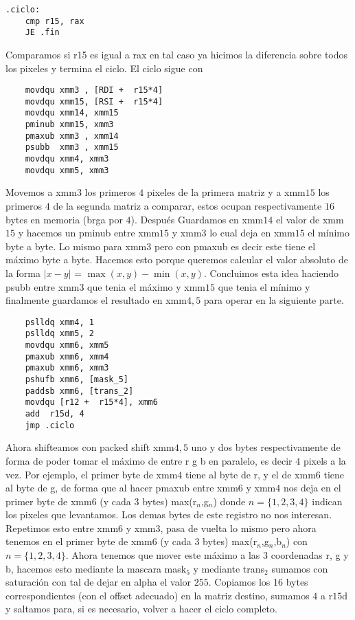 \documentclass[a4paper]{article}
\begin{document}
\begin{codesnippet}
\begin{verbatim}
.ciclo:
    cmp r15, rax
    JE .fin
\end{verbatim}
\end{codesnippet}

\noindent Comparamos si r15 es igual a rax en tal caso ya hicimos la diferencia sobre todos los pixeles y termina el ciclo. El ciclo sigue con

\begin{codesnippet}
\begin{verbatim}
    movdqu xmm3 , [RDI +  r15*4]   
    movdqu xmm15, [RSI +  r15*4]
    movdqu xmm14, xmm15     
    pminub xmm15, xmm3        
    pmaxub xmm3 , xmm14        
    psubb  xmm3 , xmm15             
    movdqu xmm4, xmm3 
    movdqu xmm5, xmm3       
\end{verbatim}
\end{codesnippet}

\noindent Movemos a xmm$3$ los primeros $4$ pixeles de la primera matriz y a xmm$15$ los primeros $4$ de la segunda matriz a comparar, estos ocupan respectivamente $16$ bytes en memoria (brga por $4$). Después Guardamos en xmm$14$ el valor de xmm$15$ y hacemos un pminub entre xmm$15$ y xmm$3$ lo cual deja en xmm$15$ el mínimo byte a byte. Lo mismo para xmm$3$ pero con pmaxub es decir este tiene el máximo byte a byte. Hacemos esto porque queremos calcular el valor absoluto de la forma $|x-y|$ = $\max(x,y) - \min(x,y)$. Concluimos esta idea haciendo psubb entre xmm$3$ que tenia el máximo y xmm$15$ que tenia el mínimo y finalmente guardamos el resultado en xmm$4,5$ para operar en la siguiente parte.

\begin{codesnippet}
\begin{verbatim}
    pslldq xmm4, 1                  
    pslldq xmm5, 2               
    movdqu xmm6, xmm5             
    pmaxub xmm6, xmm4             
    pmaxub xmm6, xmm3              
    pshufb xmm6, [mask_5] 
    paddsb xmm6, [trans_2]
    movdqu [r12 +  r15*4], xmm6
    add  r15d, 4
    jmp .ciclo
\end{verbatim}
\end{codesnippet}
\noindent Ahora shifteamos con packed shift xmm$4,5$ uno y dos bytes respectivamente de forma de poder tomar el máximo de entre r g b en paralelo, es decir $4$ pixels a la vez. Por ejemplo, el primer byte de xmm$4$ tiene al byte de r, y el de xmm$6$ tiene al byte de g, de forma que al hacer pmaxub entre  xmm$6$ y xmm$4$ nos deja en el primer byte de xmm$6$ (y cada 3 bytes) max(r$_n$,g$_n$) donde $n = \{1,2,3,4 \}$ indican los pixeles que levantamos. Los demas bytes de este registro no nos interesan. Repetimos esto entre xmm$6$ y xmm$3$, pasa de vuelta lo mismo pero ahora tenemos en el primer byte de xmm$6$ (y cada $3$ bytes) max(r$_n$,g$_n$,b$_n$) con $n = \{1,2,3,4 \}$. Ahora tenemos que mover este máximo a las 3 coordenadas r, g y b, hacemos esto mediante la mascara mask$_5$ y mediante trans$_2$ sumamos con saturación con tal de dejar en alpha el valor $255$. Copiamos los 16 bytes correspondientes (con el offset adecuado) en la matriz destino, sumamos $4$ a r$15$d y saltamos para, si es necesario, volver a hacer el ciclo completo.
\end{document}
